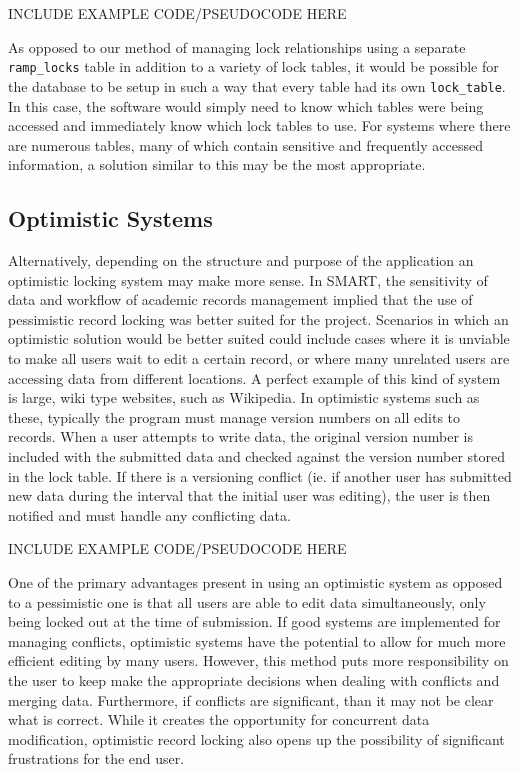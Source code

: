 \documentclass[12pt]{article}
\newcommand{\code}[1]{\texttt{#1}}
\begin{document}
INCLUDE EXAMPLE CODE/PSEUDOCODE HERE

As opposed to our method of managing lock relationships using a separate \code{ramp\_locks} table in addition to a variety of lock tables, it would be possible for the database to be setup in such a way that every table had its own \code{lock\_table}. In this case, the software would simply need to know which tables were being accessed and immediately know which lock tables to use. For systems where there are numerous tables, many of which contain sensitive and frequently accessed information, a solution similar to this may be the most appropriate.

\subsection{Optimistic Systems}
Alternatively, depending on the structure and purpose of the application an optimistic locking system may make more sense. In SMART, the sensitivity of data and workflow of academic records management implied that the use of pessimistic record locking was better suited for the project. Scenarios in which an optimistic solution would be better suited could include cases where it is unviable to make all users wait to edit a certain record, or where many unrelated users are accessing data from different locations. A perfect example of this kind of system is large, wiki type websites, such as Wikipedia. In optimistic systems such as these, typically the program must manage version numbers on all edits to records. When a user attempts to write data, the original version number is included with the submitted data and checked against the version number stored in the lock table. If there is a versioning conflict (ie. if another user has submitted new data during the interval that the initial user was editing), the user is then notified and must handle any conflicting data. 

INCLUDE EXAMPLE CODE/PSEUDOCODE HERE

One of the primary advantages present in using an optimistic system as opposed to a pessimistic one is that all users are able to edit data simultaneously, only being locked out at the time of submission. If good systems are implemented for managing conflicts, optimistic systems have the potential to allow for much more efficient editing by many users. However, this method puts more responsibility on the user to keep make the appropriate decisions when dealing with conflicts and merging data. Furthermore, if conflicts are significant, than it may not be clear what is correct. While it creates the opportunity for concurrent data modification, optimistic record locking also opens up the possibility of significant frustrations for the end user.

\begin{appendices}

\end{appendices}
\end{document}
